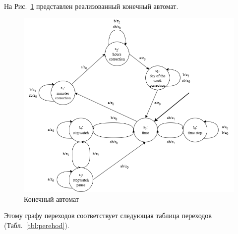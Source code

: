 \documentclass[a4paper, final]{article}
\begin{document}
На Рис.~\ref{img:automaton} представлен реализованный конечный автомат.

\begin{figure}[H]
   \centering
   \includegraphics[width=\linewidth]{automaton.png}
   \caption{Конечный автомат}
   \label{img:automaton}
\end{figure}

Этому графу переходов соответствует следующая таблица переходов (Табл.~\ref{tbl:perehod}).
\end{document}
